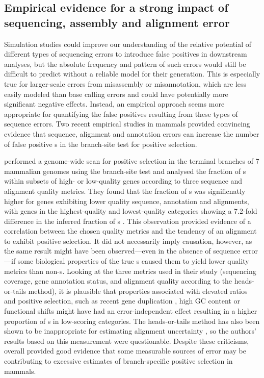 \subsection{Empirical evidence for a strong impact of sequencing, assembly and alignment error}

Simulation studies could improve our understanding of the relative
potential of different types of sequencing errors to introduce false
positives in downstream analyses, but the absolute frequency and
pattern of such errors would still be difficult to predict without a
reliable model for their generation. This is especially true for
larger-scale errors from misassembly or misannotation, which are less
easily modeled than base calling errors and could have potentially
more significant negative effects. Instead, an empirical approach
seems more appropriate for quantifying the false positives resulting
from these types of sequence errors. Two recent empirical studies in
mammals provided convincing evidence that sequence, alignment and
annotation errors can increase the number of false positive \psg{}s in
the branch-site test for positive selection.

\citet{Schneider2009} performed a genome-wide
scan for positive selection in the terminal branches of 7 mammalian
genomes using the branch-site test and analysed the fraction of
\psg{}s within subsets of high- or low-quality genes according to
three sequence and alignment quality metrics. They found that the
fraction of \psg{}s was significnatly higher for genes exhibiting
lower quality sequence, annotation and alignments, with genes in the
highest-quality and lowest-quality categories showing a 7.2-fold
difference in the inferred fraction of \psg{}s
\citep{Schneider2009}. This observation provided evidence of a
correlation between the chosen quality metrics and the tendency of an
alignment to exhibit positive selection. It did not necessarily imply
causation, however, as the same result might have been observed---even
in the absence of sequence error---if some biological properties of
the true \psg{}s caused them to yield lower quality metrics than
non-\psg{}s. Looking at the three metrics used in their study
(sequencing coverage, gene annotation status, and alignment quality
according to the heads-or-tails method), it is plausible that
properties associated with elevated \omg ratios and positive
selection, such as recent gene duplication
\citep{Beisswanger2008,Studer2008,Casola2009}, high GC content
\citep{Ratnakumar2010} or functional shifts \citep{Storz2008,Wang2001}
might have had an error-independent effect resulting in a higher
proportion of \psg{}s in low-scoring categories. The heads-or-tails
method has also been shown to be inappropriate for estimating
alignment uncertainty \citep{Fletcher2010}, so the authors' results
based on this measurement were questionable. Despite these criticisms,
overall \citet{Schneider2009} provided good evidence that some
measurable sources of error may be contributing to excessive estimates
of branch-specific positive selection in mammals.


